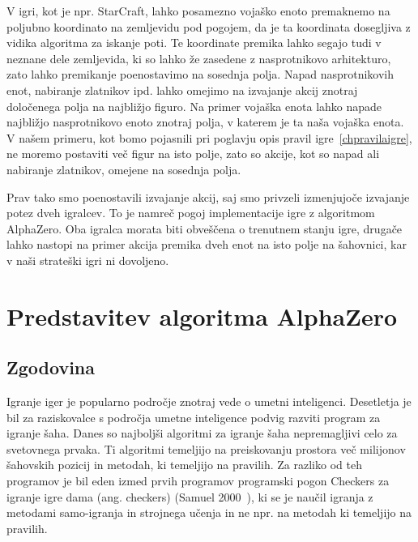 \documentclass[a4paper, 12pt]{book}
\begin{document}
V igri, kot je npr. StarCraft, lahko posamezno vojaško enoto premaknemo na poljubno koordinato na zemljevidu pod pogojem, da je ta koordinata dosegljiva z vidika algoritma za iskanje poti.
Te koordinate premika lahko segajo tudi v neznane dele zemljevida, ki so lahko že zasedene z nasprotnikovo arhitekturo, zato lahko premikanje poenostavimo na sosednja polja.
Napad nasprotnikovih enot, nabiranje zlatnikov ipd. lahko omejimo na izvajanje akcij znotraj določenega polja na najbližjo figuro.
Na primer vojaška enota lahko napade najbližjo nasprotnikovo enoto znotraj polja, v katerem je ta naša vojaška enota.
V našem primeru, kot bomo pojasnili pri poglavju opis pravil igre~\ref{chpravilaigre}, ne moremo postaviti več figur na isto polje, zato so akcije, kot so napad ali nabiranje zlatnikov, omejene na sosednja polja.

Prav tako smo poenostavili izvajanje akcij, saj smo privzeli izmenjujoče izvajanje potez dveh igralcev.
To je namreč pogoj implementacije igre z algoritmom AlphaZero.
Oba igralca morata biti obveščena o trenutnem stanju igre, drugače lahko nastopi na primer akcija premika dveh enot na isto polje na šahovnici, kar v naši strateški igri ni dovoljeno.


\chapter{Predstavitev algoritma AlphaZero}
\label{alphazero}
\section{Zgodovina}

Igranje iger je popularno področje znotraj vede o umetni inteligenci. 
Desetletja je bil za raziskovalce s področja umetne inteligence podvig razviti program za igranje šaha.
Danes so najboljši algoritmi za igranje šaha nepremagljivi celo za svetovnega prvaka.
Ti algoritmi temeljijo na preiskovanju prostora več milijonov šahovskih pozicij in metodah, ki temeljijo na pravilih.
Za razliko od teh programov je bil eden izmed prvih programov programski pogon Checkers za igranje igre dama (ang. checkers) (Samuel 2000~{\cite{samuel2000some}}), ki se je naučil igranja z metodami samo-igranja in strojnega učenja in ne npr. na metodah ki temeljijo na pravilih.
\end{document}
